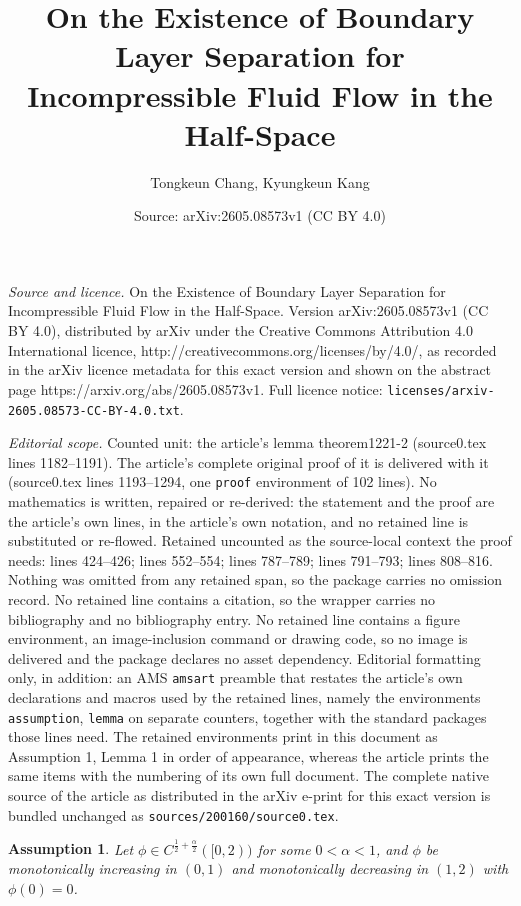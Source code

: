 \documentclass[10pt,a4paper]{amsart}
\title{On the Existence of Boundary Layer Separation for Incompressible Fluid Flow in the Half-Space}
\author{Tongkeun Chang, Kyungkeun Kang}
\date{Source: arXiv:2605.08573v1 (CC BY 4.0)}
\newtheorem{assumption}{Assumption}
\newcommand {\al}{\alpha}
\begin{document}
\maketitle

\noindent\emph{Source and licence.} On the Existence of Boundary Layer Separation for Incompressible Fluid Flow in the Half-Space. Version arXiv:2605.08573v1 (CC BY 4.0), distributed by arXiv under the Creative Commons Attribution 4.0 International licence, http://creativecommons.org/licenses/by/4.0/, as recorded in the arXiv licence metadata for this exact version and shown on the abstract page https://arxiv.org/abs/2605.08573v1. Full licence notice: \texttt{licenses/arxiv-2605.08573-CC-BY-4.0.txt}.\par\smallskip

\noindent\textit{Editorial scope.} Counted unit: the article's lemma theorem1221-2 (source0.tex lines 1182--1191). The article's complete original proof of it is delivered with it (source0.tex lines 1193--1294, one \texttt{proof} environment of 102 lines). No mathematics is written, repaired or re-derived: the statement and the proof are the article's own lines, in the article's own notation, and no retained line is substituted or re-flowed.  Retained uncounted as the source-local context the proof needs: lines 424--426; lines 552--554; lines 787--789; lines 791--793; lines 808--816.  Nothing was omitted from any retained span, so the package carries no omission record.  No retained line contains a citation, so the wrapper carries no bibliography and no bibliography entry.  No retained line contains a figure environment, an image-inclusion command or drawing code, so no image is delivered and the package declares no asset dependency.  Editorial formatting only, in addition: an AMS \texttt{amsart} preamble that restates the article's own declarations and macros used by the retained lines, namely the environments \texttt{assumption}, \texttt{lemma} on separate counters, together with the standard packages those lines need.  The retained environments print in this document as Assumption 1, Lemma 1 in order of appearance, whereas the article prints the same items with the numbering of its own full document.  The complete native source of the article as distributed in the arXiv e-print for this exact version is bundled unchanged as \texttt{sources/200160/source0.tex}.
\begin{assumption}\label{assume1}
Let $\phi \in C^{\frac12 +\frac{\al}2} ([0, 2 ) )$ for some $ 0 < \al  <1$,  and $ \phi$ be monotonically increasing in $(0,1)$ and monotonically decreasing in $(1,2)$ with $\phi(0) =0$.   
\end{assumption}
\end{document}
